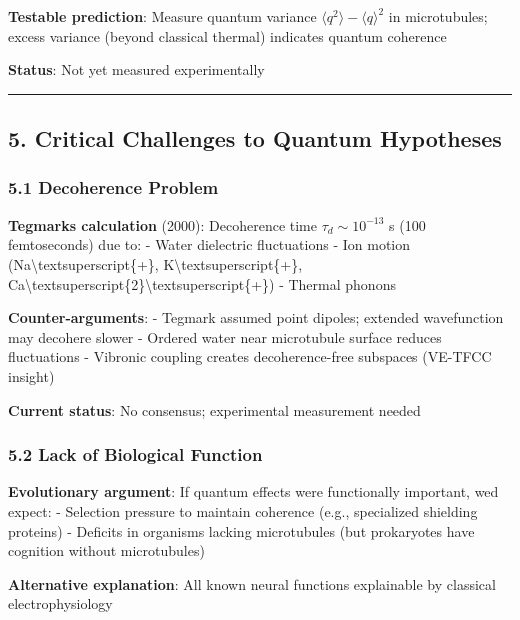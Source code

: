 \textbf{Testable prediction}: Measure quantum variance
\(\langle q^2 \rangle - \langle q \rangle^2\) in microtubules; excess
variance (beyond classical thermal) indicates quantum coherence

\textbf{Status}: Not yet measured experimentally

\begin{center}\rule{0.5\linewidth}{0.5pt}\end{center}

\subsection{5. Critical Challenges to Quantum
Hypotheses}\label{critical-challenges-to-quantum-hypotheses}

\subsubsection{5.1 Decoherence Problem}\label{decoherence-problem}

\textbf{Tegmark\textquotesingle s calculation} (2000): Decoherence time
\(\tau_d \sim 10^{-13}\) s (100 femtoseconds) due to: - Water dielectric
fluctuations - Ion motion (Na\textbackslash textsuperscript\{+\},
K\textbackslash textsuperscript\{+\},
Ca\textbackslash textsuperscript\{2\}\textbackslash textsuperscript\{+\})
- Thermal phonons

\textbf{Counter-arguments}: - Tegmark assumed point dipoles; extended
wavefunction may decohere slower - Ordered water near microtubule
surface reduces fluctuations - Vibronic coupling creates
decoherence-free subspaces (VE-TFCC insight)

\textbf{Current status}: No consensus; experimental measurement needed

\subsubsection{5.2 Lack of Biological
Function}\label{lack-of-biological-function}

\textbf{Evolutionary argument}: If quantum effects were functionally
important, we\textquotesingle d expect: - Selection pressure to maintain
coherence (e.g., specialized shielding proteins) - Deficits in organisms
lacking microtubules (but prokaryotes have cognition without
microtubules)

\textbf{Alternative explanation}: All known neural functions explainable
by classical electrophysiology

